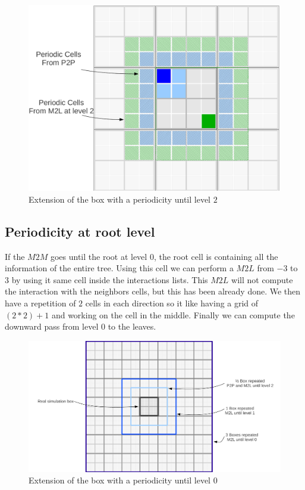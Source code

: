 \documentclass[12pt]{article} %
\begin{document}
\begin{figure}[h]
\centering
\includegraphics[scale=0.35]{../Images/PeriodicL2}
\caption{Extension of the box with a periodicity until level $2$}
\end{figure}

\subsection{Periodicity at root level}
If the $M2M$ goes until the root at level $0$, the root cell is containing all the information of the entire tree.
Using this cell we can perform a $M2L$ from $-3$ to $3$ by using it same cell inside the interactions lists.
This $M2L$ will not compute the interaction with the neighbors cells, but this has been already done.
We then have a repetition of $2$ cells in each direction so it like having a grid of $(2*2)+1$ and working on the cell in the middle.
Finally we can compute the downward pass from level $0$ to the leaves.

\begin{figure}[h]
\centering
\includegraphics[scale=0.45]{../Images/PeriodicL0}
\caption{Extension of the box with a periodicity until level $0$}
\end{figure}
\end{document}
